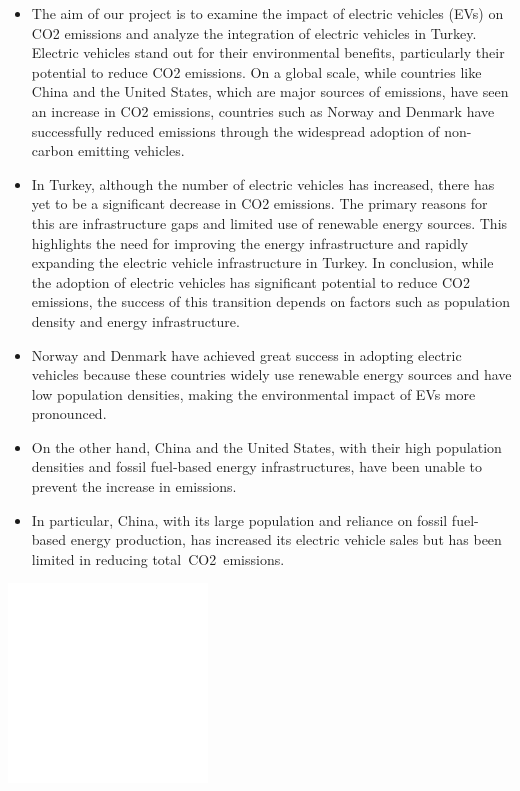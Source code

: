 \documentclass[
  11pt,
  a4paper,
  DIV=11,
  numbers=noendperiod]{scrartcl}
\begin{document}
\begin{itemize}
\item
  The aim of our project is to examine the impact of electric vehicles
  (EVs) on CO2 emissions and analyze the integration of electric
  vehicles in Turkey. Electric vehicles stand out for their
  environmental benefits, particularly their potential to reduce CO2
  emissions. On a global scale, while countries like China and the
  United States, which are major sources of emissions, have seen an
  increase in CO2 emissions, countries such as Norway and Denmark have
  successfully reduced emissions through the widespread adoption of
  non-carbon emitting vehicles.
\item
  In Turkey, although the number of electric vehicles has increased,
  there has yet to be a significant decrease in CO2 emissions. The
  primary reasons for this are infrastructure gaps and limited use of
  renewable energy sources. This highlights the need for improving the
  energy infrastructure and rapidly expanding the electric vehicle
  infrastructure in Turkey. In conclusion, while the adoption of
  electric vehicles has significant potential to reduce CO2 emissions,
  the success of this transition depends on factors such as population
  density and energy infrastructure.
\item
  Norway and Denmark have achieved great success in adopting electric
  vehicles because these countries widely use renewable energy sources
  and have low population densities, making the environmental impact of
  EVs more pronounced.
\item
  On the other hand, China and the United States, with their high
  population densities and fossil fuel-based energy infrastructures,
  have been unable to prevent the increase in emissions.
\item
  In particular, China, with its large population and reliance on fossil
  fuel-based energy production, has increased its electric vehicle sales
  but has been limited in reducing total~CO2~emissions.
\end{itemize}

\begin{center}
\includegraphics{docs/chillguy-chill.gif}
\end{center}
\end{document}
